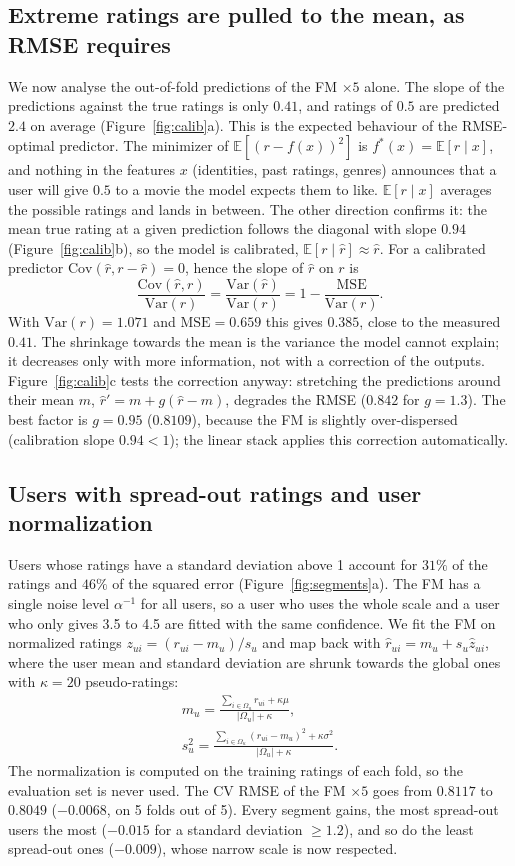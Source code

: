 \documentclass[10pt,a4paper,twocolumn]{article}
\newcommand{\E}{\mathbb{E}}
\newcommand{\Var}{\mathrm{Var}}
\newcommand{\Cov}{\mathrm{Cov}}
\newcommand{\rhat}{\hat r}
\begin{document}
\subsection{Extreme ratings are pulled to the mean, as RMSE requires}\label{sec:extremes}
We now analyse the out-of-fold predictions of the FM $\times 5$ alone. The slope of the predictions against
the true ratings is only $0.41$, and ratings of $0.5$ are predicted $2.4$ on average (Figure~\ref{fig:calib}a).
This is the expected behaviour of the RMSE-optimal predictor. The minimizer of $\E[(r - f(x))^2]$ is
$f^*(x) = \E[r \mid x]$, and nothing in the features $x$ (identities, past ratings, genres) announces that a
user will give $0.5$ to a movie the model expects them to like. $\E[r\mid x]$ averages the possible ratings and
lands in between. The other direction confirms it: the mean true rating at a given prediction follows the
diagonal with slope $0.94$ (Figure~\ref{fig:calib}b), so the model is calibrated,
$\E[r \mid \rhat] \approx \rhat$. For a calibrated predictor $\Cov(\rhat, r - \rhat) = 0$, hence the slope of
$\rhat$ on $r$ is
\[
\frac{\Cov(\rhat, r)}{\Var(r)} = \frac{\Var(\rhat)}{\Var(r)} = 1 - \frac{\mathrm{MSE}}{\Var(r)} .
\]
With $\Var(r) = 1.071$ and $\mathrm{MSE} = 0.659$ this gives $0.385$, close to the measured $0.41$. The
shrinkage towards the mean is the variance the model cannot explain; it decreases only with more information,
not with a correction of the outputs. Figure~\ref{fig:calib}c tests the correction anyway: stretching the
predictions around their mean $m$, $\rhat' = m + g(\rhat - m)$, degrades the RMSE ($0.842$ for $g = 1.3$).
The best factor is $g = 0.95$ ($0.8109$), because the FM is slightly over-dispersed (calibration slope
$0.94 < 1$); the linear stack applies this correction automatically.

\subsection{Users with spread-out ratings and user normalization}
Users whose ratings have a standard deviation above 1 account for $31\%$ of the ratings and $46\%$ of the
squared error (Figure~\ref{fig:segments}a). The FM has a single noise level $\alpha^{-1}$ for all users, so a
user who uses the whole scale and a user who only gives 3.5 to 4.5 are fitted with the same confidence. We fit
the FM on normalized ratings $z_{ui} = (r_{ui} - m_u)/s_u$ and map back with $\rhat_{ui} = m_u + s_u \hat z_{ui}$,
where the user mean and standard deviation are shrunk towards the global ones with $\kappa = 20$
pseudo-ratings:
\begin{gather*}
m_u = \frac{\sum_{i\in\Omega_u} r_{ui} + \kappa\mu}{|\Omega_u| + \kappa},\\
s_u^2 = \frac{\sum_{i\in\Omega_u} (r_{ui} - m_u)^2 + \kappa\sigma^2}{|\Omega_u| + \kappa}.
\end{gather*}
The normalization is computed on the training ratings of each fold, so the evaluation set is never used.
The CV RMSE of the FM $\times 5$ goes from $0.8117$ to $0.8049$ ($-0.0068$, on 5 folds out of 5). Every
segment gains, the most spread-out users the most ($-0.015$ for a standard deviation $\ge 1.2$), and so do the
least spread-out ones ($-0.009$), whose narrow scale is now respected.
\end{document}
